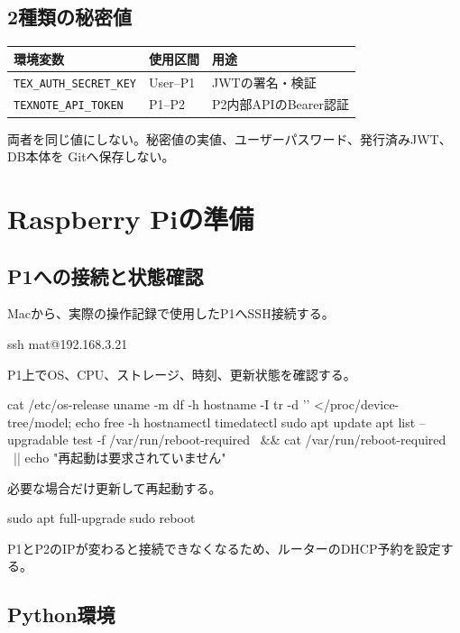 \documentclass[uplatex,dvipdfmx,a4paper,11pt]{jsarticle}
\begin{document}
\subsection{2種類の秘密値}

\begin{longtable}{@{}p{43mm}p{42mm}p{65mm}@{}}
\toprule
環境変数 & 使用区間 & 用途\\
\midrule
\texttt{TEX\_AUTH\_SECRET\_KEY} & User--P1 & JWTの署名・検証\\
\texttt{TEXNOTE\_API\_TOKEN} & P1--P2 & P2内部APIのBearer認証\\
\bottomrule
\end{longtable}

両者を同じ値にしない。秘密値の実値、ユーザーパスワード、発行済みJWT、DB本体を
Gitへ保存しない。

\section{Raspberry Piの準備}

\subsection{P1への接続と状態確認}

Macから、実際の操作記録で使用したP1へSSH接続する。

\begin{command}
ssh mat@192.168.3.21
\end{command}

P1上でOS、CPU、ストレージ、時刻、更新状態を確認する。

\begin{command}
cat /etc/os-release
uname -m
df -h
hostname -I
tr -d '\0' </proc/device-tree/model; echo
free -h
hostnamectl
timedatectl
sudo apt update
apt list --upgradable
test -f /var/run/reboot-required \
  && cat /var/run/reboot-required \
  || echo "再起動は要求されていません"
\end{command}

必要な場合だけ更新して再起動する。

\begin{command}
sudo apt full-upgrade
sudo reboot
\end{command}

P1とP2のIPが変わると接続できなくなるため、ルーターのDHCP予約を設定する。

\subsection{Python環境}
\end{document}
